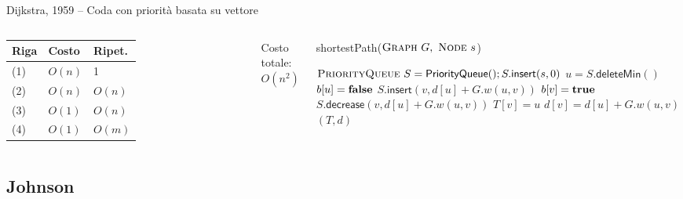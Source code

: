 \begin{frame}{Dijkstra, 1959 -- Coda con priorità basata su vettore}



\begin{columns}

\begin{tabular}{|l|l|l|}
\hline
Riga & Costo & Ripet. \\\hline
(1) & $O(n)$ & 1 \\\hline
(2) & $O(n)$ & $O(n)$ \\\hline
(3) & $O(1)$ & $O(n)$ \\\hline
(4) & $O(1)$ & $O(m)$ \\\hline
\end{tabular}

\medskip
Costo totale: \alert{$O(n^2)$}

\vspace{-12pt}
\tiny
\begin{Procedure}
\caption[A]{\textsf{shortestPath}($\textsc{Graph}\ G,\ \textsc{Node}\ s$)}
\alert{$\textsc{PriorityQueue}\ S = \textsf{PriorityQueue}(); S.\textsf{insert}(s, 0)$}\;
{
  \alert{$u = S.\textsf{deleteMin}()$}\;
  $b[u] = \FALSE$\;
  {
    {
      {
        \alert{$S.\textsf{insert}(v, d[u]+G.w(u,v))$}\;
        $b[v] = \TRUE$\;
      }
      {
        \alert{$S.\textsf{decrease}(v, d[u]+G.w(u,v))$}
      }
      $T[v] = u$\;
      $d[v] = d[u] + G.w(u,v)$\;
    }
  }
}
\Return $(T,d)$
\end{Procedure}
\end{columns}



\end{frame}

\subsection{Johnson}

